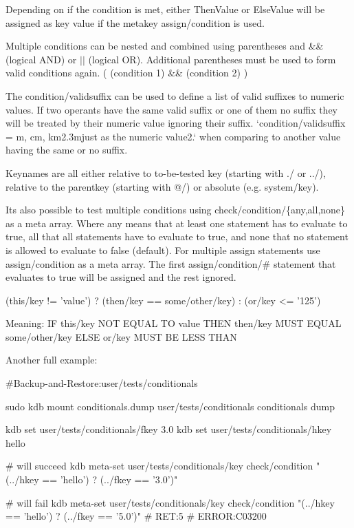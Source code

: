 Depending on if the condition is met, either \textquotesingle{}Then\+Value\textquotesingle{} or \textquotesingle{}Else\+Value\textquotesingle{} will be assigned as key value if the metakey {\ttfamily assign/condition} is used.

Multiple conditions can be nested and combined using parentheses and {\ttfamily \&\&} (logical A\+ND) or {\ttfamily $\vert$$\vert$} (logical OR). Additional parentheses must be used to form valid conditions again. {\ttfamily (} {\ttfamily (condition 1) \&\& (condition 2)} {\ttfamily )}

The {\ttfamily condition/validsuffix} can be used to define a list of valid suffixes to numeric values. If two operants have the same valid suffix or one of them no suffix they will be treated by their numeric value ignoring their suffix. `condition/validsuffix = \textquotesingle{}m\textquotesingle{}, \textquotesingle{}cm\textquotesingle{}, \textquotesingle{}km2.\+3m{\ttfamily just as the numeric value}2.` when comparing to another value having the same or no suffix.

Keynames are all either relative to to-\/be-\/tested key (starting with {\ttfamily ./} or {\ttfamily ../}), relative to the parentkey (starting with {\ttfamily @/}) or absolute (e.\+g. {\ttfamily system/key}).

It\textquotesingle{}s also possible to test multiple conditions using {\ttfamily check/condition/\{any,all,none\}} as a meta array. Where {\ttfamily any} means that at least one statement has to evaluate to true, {\ttfamily all} that all statements have to evaluate to true, and {\ttfamily none} that no statement is allowed to evaluate to false (default). For multiple assign statements use {\ttfamily assign/condition} as a meta array. The first {\ttfamily assign/condition/\#} statement that evaluates to true will be assigned and the rest ignored.


\begin{DoxyCode}
(this/key  != 'value') ? (then/key == some/other/key) : (or/key <= '125')
\end{DoxyCode}


Meaning\+: IF {\ttfamily this/key} N\+OT E\+Q\+U\+AL TO {\ttfamily \textquotesingle{}value\textquotesingle{}} T\+H\+EN {\ttfamily then/key} M\+U\+ST E\+Q\+U\+AL {\ttfamily some/other/key} E\+L\+SE {\ttfamily or/key} M\+U\+ST BE L\+E\+SS T\+H\+AN {}

Another full example\+:


\begin{DoxyCode}
#Backup-and-Restore:user/tests/conditionals

sudo kdb mount conditionals.dump user/tests/conditionals conditionals dump

kdb set user/tests/conditionals/fkey 3.0
kdb set user/tests/conditionals/hkey hello

# will succeed
kdb meta-set user/tests/conditionals/key check/condition "(../hkey == 'hello') ? (../fkey == '3.0')"

# will fail
kdb meta-set user/tests/conditionals/key check/condition "(../hkey == 'hello') ? (../fkey == '5.0')"
# RET:5
# ERROR:C03200
\end{DoxyCode}


